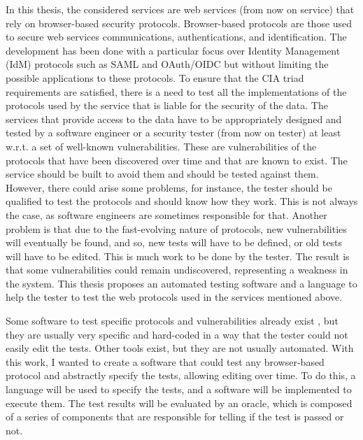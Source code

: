 In this thesis, the considered services are web services (from now on service) that rely on browser-based security protocols. Browser-based protocols are those used to secure web services communications, authentications, and identification. The development has been done with a particular focus over Identity Management (IdM) protocols such as \gls{SAML} and \gls{OAuth}/OIDC but without limiting the possible applications to these protocols.
To ensure that the CIA triad requirements are satisfied, there is a need to test all the implementations of the protocols used by the service that is liable for the security of the data. The services that provide access to the data have to be appropriately designed and tested by a software engineer or a security tester (from now on tester) at least w.r.t. a set of well-known vulnerabilities. These are vulnerabilities of the protocols that have been discovered over time and that are known to exist. The service should be built to avoid them and should be tested against them. However, there could arise some problems, for instance, the tester should be qualified to test the protocols and should know how they work. This is not always the case, as software engineers are sometimes responsible for that. Another problem is that due to the fast-evolving nature of protocols, new vulnerabilities will eventually be found, and so, new tests will have to be defined, or old tests will have to be edited. This is much work to be done by the tester. The result is that some vulnerabilities could remain undiscovered, representing a weakness in the system. This thesis proposes an automated testing software and a language to help the tester to test the web protocols used in the services mentioned above. 

Some software to test specific protocols and vulnerabilities already exist \cite{wendy_barreto,claudio_grisenti}, but they are usually very specific and hard-coded in a way that the tester could not easily edit the tests. Other tools exist, but they are not usually automated. With this work, I wanted to create a software that could test any browser-based protocol and abstractly specify the tests, allowing editing over time. To do this, a language will be used to specify the tests, and a software will be implemented to execute them. The test results will be evaluated by an oracle, which is composed of a series of components that are responsible for telling if the test is passed or not.

